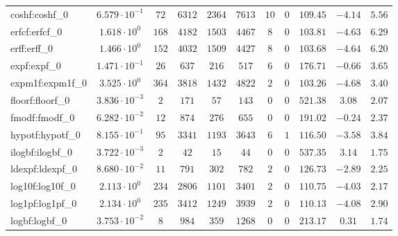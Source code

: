 \begin{tabular}{|l|c|c|c|c|c|c|c|c|c|c|}
coshf:coshf\_0               & $ 6.579 \cdot 10^{-1} $ & $ 72     $ & $ 6312   $ & $ 2364  $ & $ 7613   $ & $ 10  $ & $ 0 $ & $ 109.45      $ & $ -4.14   $ & $ 5.56    $ \\
erfcf:erfcf\_0               & $ 1.618 \cdot 10^{0}  $ & $ 168    $ & $ 4182   $ & $ 1503  $ & $ 4467   $ & $ 8   $ & $ 0 $ & $ 103.81      $ & $ -4.63   $ & $ 6.29    $ \\
erff:erff\_0                 & $ 1.466 \cdot 10^{0}  $ & $ 152    $ & $ 4032   $ & $ 1509  $ & $ 4427   $ & $ 8   $ & $ 0 $ & $ 103.68      $ & $ -4.64   $ & $ 6.20    $ \\
expf:expf\_0                 & $ 1.471 \cdot 10^{-1} $ & $ 26     $ & $ 637    $ & $ 216   $ & $ 517    $ & $ 6   $ & $ 0 $ & $ 176.71      $ & $ -0.66   $ & $ 3.65    $ \\
expm1f:expm1f\_0             & $ 3.525 \cdot 10^{0}  $ & $ 364    $ & $ 3818   $ & $ 1432  $ & $ 4822   $ & $ 2   $ & $ 0 $ & $ 103.26      $ & $ -4.68   $ & $ 3.40    $ \\
floorf:floorf\_0             & $ 3.836 \cdot 10^{-3} $ & $ 2      $ & $ 171    $ & $ 57    $ & $ 143    $ & $ 0   $ & $ 0 $ & $ 521.38      $ & $ 3.08    $ & $ 2.07    $ \\
fmodf:fmodf\_0               & $ 6.282 \cdot 10^{-2} $ & $ 12     $ & $ 874    $ & $ 276   $ & $ 655    $ & $ 0   $ & $ 0 $ & $ 191.02      $ & $ -0.24   $ & $ 2.37    $ \\
hypotf:hypotf\_0             & $ 8.155 \cdot 10^{-1} $ & $ 95     $ & $ 3341   $ & $ 1193  $ & $ 3643   $ & $ 6   $ & $ 1 $ & $ 116.50      $ & $ -3.58   $ & $ 3.84    $ \\
ilogbf:ilogbf\_0             & $ 3.722 \cdot 10^{-3} $ & $ 2      $ & $ 42     $ & $ 15    $ & $ 44     $ & $ 0   $ & $ 0 $ & $ 537.35      $ & $ 3.14    $ & $ 1.75    $ \\
ldexpf:ldexpf\_0             & $ 8.680 \cdot 10^{-2} $ & $ 11     $ & $ 791    $ & $ 302   $ & $ 782    $ & $ 2   $ & $ 0 $ & $ 126.73      $ & $ -2.89   $ & $ 2.25    $ \\
log10f:log10f\_0             & $ 2.113 \cdot 10^{0}  $ & $ 234    $ & $ 2806   $ & $ 1101  $ & $ 3401   $ & $ 2   $ & $ 0 $ & $ 110.75      $ & $ -4.03   $ & $ 2.17    $ \\
log1pf:log1pf\_0             & $ 2.134 \cdot 10^{0}  $ & $ 235    $ & $ 3412   $ & $ 1249  $ & $ 3939   $ & $ 2   $ & $ 0 $ & $ 110.13      $ & $ -4.08   $ & $ 2.90    $ \\
logbf:logbf\_0               & $ 3.753 \cdot 10^{-2} $ & $ 8      $ & $ 984    $ & $ 359   $ & $ 1268   $ & $ 0   $ & $ 0 $ & $ 213.17      $ & $ 0.31    $ & $ 1.74    $ \\

\end{tabular}

